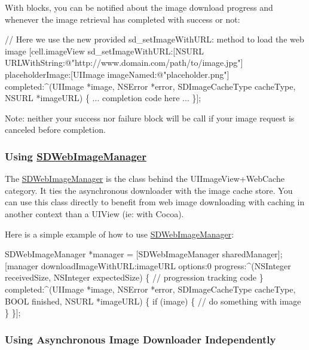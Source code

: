 With blocks, you can be notified about the image download progress and whenever the image retrieval has completed with success or not\+:


\begin{DoxyCode}
// Here we use the new provided sd\_setImageWithURL: method to load the web image
[cell.imageView sd\_setImageWithURL:[NSURL URLWithString:@"http://www.domain.com/path/to/image.jpg"]
                      placeholderImage:[UIImage imageNamed:@"placeholder.png"]
                             completed:^(UIImage *image, NSError *error, SDImageCacheType cacheType, NSURL
       *imageURL) \{
                                ... completion code here ...
                             \}];
\end{DoxyCode}


Note\+: neither your success nor failure block will be call if your image request is canceled before completion.

\subsubsection*{Using \mbox{\hyperlink{interface_s_d_web_image_manager}{S\+D\+Web\+Image\+Manager}}}

The \mbox{\hyperlink{interface_s_d_web_image_manager}{S\+D\+Web\+Image\+Manager}} is the class behind the U\+I\+Image\+View+\+Web\+Cache category. It ties the asynchronous downloader with the image cache store. You can use this class directly to benefit from web image downloading with caching in another context than a U\+I\+View (ie\+: with Cocoa).

Here is a simple example of how to use \mbox{\hyperlink{interface_s_d_web_image_manager}{S\+D\+Web\+Image\+Manager}}\+:


\begin{DoxyCode}
SDWebImageManager *manager = [SDWebImageManager sharedManager];
[manager downloadImageWithURL:imageURL
                      options:0
                     progress:^(NSInteger receivedSize, NSInteger expectedSize) \{
                         // progression tracking code
                     \}
                     completed:^(UIImage *image, NSError *error, SDImageCacheType cacheType, BOOL finished,
       NSURL *imageURL) \{
                         if (image) \{
                             // do something with image
                         \}
                     \}];
\end{DoxyCode}


\subsubsection*{Using Asynchronous Image Downloader Independently}

